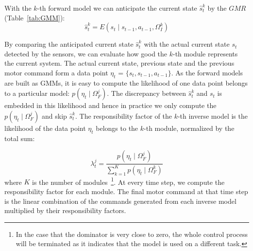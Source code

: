 %
%

With the $k$-th forward model we can anticipate the current state ${\hat{s}} ^k_t$ by the $GMR$ (Table~\ref{tab:GMM}):
\begin{equation}
\label{e3}
{\hat{s}} ^k_{t} = E\left({s_t {\mid} s_{t-1}, a_{t-1}, \Omega^k_I}\right)
\end{equation}

By comparing the anticipated current state ${\hat{s}} ^k_t$ with the actual current state $s_t$ detected by the sensors, we can evaluate how good the $k$-th module represents the current system. The actual current state, previous state and the previous motor command form a data point $\eta_t$ = $\{s_t,s_{t-1},a_{t-1}\}$. As the forward models are built as GMMs, it is easy to compute the likelihood of one data point belongs to a particular model: $p(\eta_t {\mid} \Omega_F^j)$. The discrepancy between $\hat{s}^k_t$ and $s_t$ is embedded in this likelihood and hence in practice we only compute the $p(\eta_t {\mid} \Omega_F^j)$ and skip ${\hat{s}} ^k_t$.
The responsibility factor of the $k$-th inverse model is the likelihood of the data point $\eta_t$ belongs to the $k$-th module, normalized by the total sum:

\begin{equation}
\lambda^j_t = \frac{p(\eta_t {\mid} \Omega_F^j)}{\sum_{k=1}^{K}{p(\eta_t {\mid} \Omega_F^k)}}
\end{equation}
where $K$ is the number of modules~\footnote{In the case that the dominator is very close to zero, the whole control process will be terminated as it indicates that the model is used on a different task.}.  At every time step, we compute the responsibility factor for each module. The final motor command at that time step is the linear combination of the commands generated from each inverse model multiplied by their responsibility factors.


